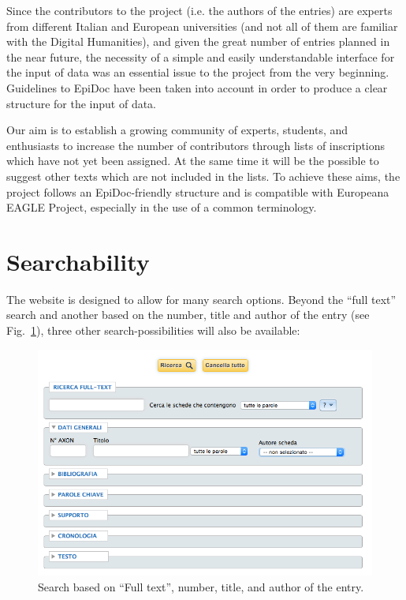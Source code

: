 \documentclass[amsthm,ebook]{saparticle}
\begin{document}
\noindent Since the contributors to the project (i.e. the authors of the entries) are experts from different Italian and European
universities (and not all of them are familiar with the Digital Humanities), and given the great number of entries
planned in the near future, the necessity of a simple and easily understandable interface for the input of data was an
essential issue to the project from the very beginning. Guidelines to EpiDoc have been taken into account in order to
produce a clear structure for the input of data.

Our aim is to establish a growing community of experts, students, and enthusiasts to increase the number of contributors
through lists of inscriptions which have not yet been assigned. At the same time it will be the possible to suggest
other texts which are not included in the lists. To achieve these aims, the project follows an EpiDoc-friendly
structure and is compatible with Europeana EAGLE Project, especially in the use of a common terminology. 







\section{Searchability}





\noindent The website is designed to allow for many search options. Beyond the ``full text'' search and another based on the number,
title and author of the entry (see Fig.~\ref{fig:3}), three other search-possibilities will also be available:

\begin{figure}[!bp]
\centering
 \includegraphics[width=\columnwidth]{EAGLE2016FullPaperrevised-img003.png}
\caption{Search based on ``Full text'', number, title, and author of the entry.}
\label{fig:3}
\end{figure}
\end{document}
